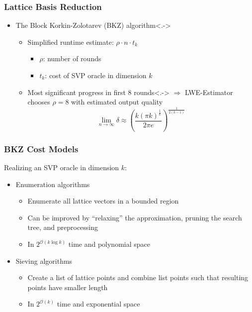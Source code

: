 \documentclass[t, aspectratio=169]{beamer}
\begin{document}
\begin{frame}
    \frametitle{Lattice Basis Reduction}
    \begin{itemize}[<+->]
        \item The Block Korkin-Zolotarev (BKZ) algorithm\only<.->{}
              \begin{itemize}[<+->]
                  \item Simplified runtime estimate: $\rho \cdot n \cdot t_k$
                        \begin{itemize}
                            \item $\rho$: number of rounds
                            \item $t_k$: cost of SVP oracle in dimension $k$
                        \end{itemize}
                  \item Most significant progress in first $8$ rounds\only<.->{} $\Rightarrow$ LWE-Estimator chooses $\rho = 8$ with estimated output quality
                        \begin{equation*}
                            \lim_{n\rightarrow \infty} \delta \approx \left( \frac{k (\pi k)^{\frac{1}{k}}}{2\pi e}\right)^{\frac{1}{2(k-1)}}
                        \end{equation*}
              \end{itemize}
    \end{itemize}
\end{frame}
\begin{frame}
    \frametitle{BKZ Cost Models}
    Realizing an SVP oracle in dimension $k$:\pause
    \begin{itemize}[<+->]
        \item Enumeration algorithms
              \begin{itemize}[<+->]
                  \item Enumerate all lattice vectors in a bounded region
                  \item Can be improved by ``relaxing'' the approximation, pruning the search tree, and preprocessing
                  \item In $2^{\mathcal{O}(k \log k)}$ time and polynomial space
              \end{itemize}
        \item Sieving algorithms
              \begin{itemize}[<+->]
                  \item Create a list of lattice points and combine list points such that resulting points have smaller length
                  \item In $2^{\mathcal{O}(k)}$ time and exponential space
              \end{itemize}
    \end{itemize}
\end{frame}
\end{document}

